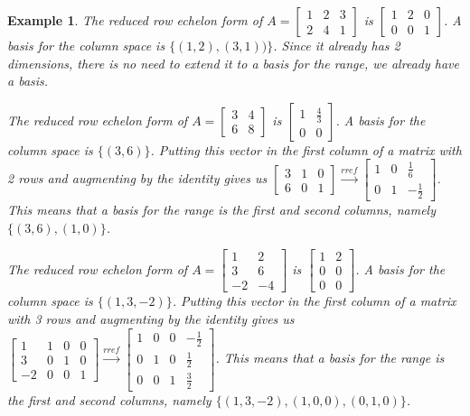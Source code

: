 \documentclass[10pt]{article}
\theoremstyle{plain}
\theoremstyle{box}
\newtheorem{example}{Example}
\begin{document}
\begin{example}
The reduced row echelon form of 
$A=
\begin{bmatrix}
 1 & 2 & 3 \\
 2 & 4 & 1
\end{bmatrix}
$
is
$
\begin{bmatrix}
 1 & 2 & 0 \\
 0 & 0 & 1
\end{bmatrix}
$.  A basis for the column space is $\{(1,2),(3,1))\}$. Since it already has 2 dimensions, there is no need to extend it to a basis for the range, we already have a basis.

The reduced row echelon form of 
$A=
\begin{bmatrix}
 3 & 4 \\
 6 & 8
\end{bmatrix}
$
is
$
\begin{bmatrix}
 1 & \frac{4}{3} \\
 0 & 0
\end{bmatrix}
$.  A basis for the column space is $\{(3,6)\}$. Putting this vector in the first column of a matrix with 2 rows and augmenting by the identity gives us 
$
\begin{bmatrix}
 3 & 1 & 0 \\
 6 & 0 & 1
\end{bmatrix}
\xrightarrow{rref}
\begin{bmatrix}
 1 & 0 & \frac{1}{6} \\
 0 & 1 & -\frac{1}{2}
\end{bmatrix}
$.
This means that a basis for the range is the first and second columns, namely $\{(3,6),(1,0)\}$.

The reduced row echelon form of 
$A=
\begin{bmatrix}
 1 & 2 \\
 3 & 6 \\
 -2 & -4
\end{bmatrix}
$
is
$
\begin{bmatrix}
 1 & 2 \\
 0 & 0 \\
 0 & 0
\end{bmatrix}
$.  A basis for the column space is $\{(1,3,-2)\}$. Putting this vector in the first column of a matrix with 3 rows and augmenting by the identity gives us 
$
\begin{bmatrix}
 1 & 1 & 0 & 0 \\
 3 & 0 & 1 & 0 \\
 -2 & 0 & 0 & 1
\end{bmatrix}
\xrightarrow{rref}
\begin{bmatrix}
 1 & 0 & 0 & -\frac{1}{2} \\
 0 & 1 & 0 & \frac{1}{2} \\
 0 & 0 & 1 & \frac{3}{2}
\end{bmatrix}
$.
This means that a basis for the range is the first and second columns, namely $\{(1,3,-2),(1,0,0),(0,1,0)\}$.




\end{example}
\end{document}

